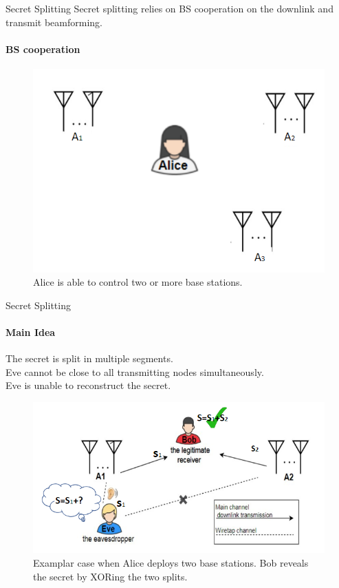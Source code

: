 \begin{frame}{Secret Splitting}
Secret splitting relies on BS cooperation on the downlink and transmit beamforming.
    \framesubtitle{BS cooperation}
    \begin{figure}
        \centering
        \includegraphics[scale=0.4]{figures/enabling_positive_secrecy_gap/SS_BS_cooperation.png}
        \caption{Alice is able to control two or more base stations.}
    \end{figure}
\end{frame}

\begin{frame}{Secret Splitting}
    \framesubtitle{Main Idea}

    The secret is split in multiple segments.\\
    Eve cannot be close to all transmitting nodes simultaneously. \\
    Eve is unable to reconstruct the secret.
    
    \begin{figure}
        \centering
        \includegraphics[scale=0.4]{figures/enabling_positive_secrecy_gap/SS_channel_model.PNG}
        \caption{Examplar case when Alice deploys two base stations. Bob reveals the secret by XORing the two splits.}
        \label{fig:enter-label}
    \end{figure}
\end{frame}

